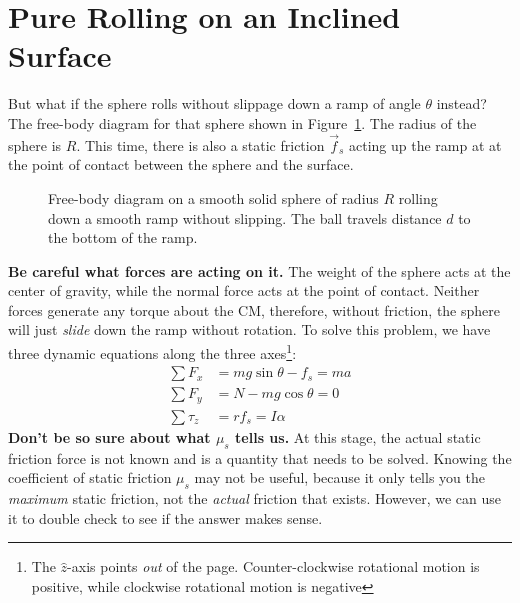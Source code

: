 \documentclass{../../oss-handout}
\newcommand{\zz}{\hat z}
\begin{document}
\section{Pure Rolling on an Inclined Surface}
But what if the sphere rolls without slippage down a ramp of angle $\theta$
instead? The free-body diagram for that sphere shown in Figure~\ref{roll-ramp}.
The radius of the sphere is $R$. This time, there is also a static friction
$\vec f_s$ acting up the ramp at at the point of contact between the sphere and
the surface.
\begin{figure}[!ht]
  \centering
  \caption{Free-body diagram on a smooth solid sphere of radius $R$ rolling
    down a smooth ramp without slipping. The ball travels distance $d$ to the
    bottom of the ramp.}
  \label{roll-ramp}
\end{figure}

\textbf{Be careful what forces are acting on it.} The weight of the sphere acts
at the center of gravity, while the normal force acts at the point of contact.
Neither forces generate any torque about the CM, therefore, without friction,
the sphere will just \emph{slide} down the ramp without rotation. To solve this
problem, we have three dynamic equations along the three
axes\footnote{The $\zz$-axis points \emph{out} of the page. Counter-clockwise
  rotational motion is positive, while clockwise rotational motion is negative}:
\begin{align}
  \sum F_x&=mg\sin\theta-f_s=ma\\ \label{f_x}
  \sum F_y&=N-mg\cos\theta=0\\
  \sum\tau_z&=rf_s=I\alpha \label{tau}
\end{align}
\textbf{Don't be so sure about what $\mu_s$ tells us.} At this stage, the
actual static friction force is not known and is a quantity that needs to be
solved. Knowing the coefficient of static friction $\mu_s$ may not be useful,
because it only tells you the \emph{maximum} static friction, not the
\emph{actual} friction that exists. However, we can use it to double check to
see if the answer makes sense.
\end{document}

